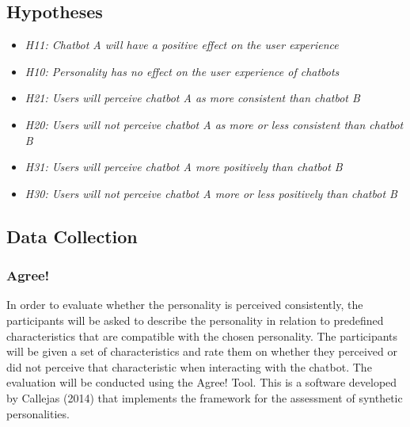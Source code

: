     \vspace{5mm} %

    \subsection{Hypotheses}
 
    \begin{itemize}
         \item \textit {H11: Chatbot A will have a positive effect on the user experience}
        \item \textit {H10: Personality has no effect on the user experience of chatbots}
            \vspace{5mm} %

        \item \textit {H21: Users will perceive chatbot A as more consistent than chatbot B}
        \item  \textit {H20: Users will not perceive chatbot A as more or less consistent than chatbot B} 
            \vspace{5mm} %

        \item \textit {H31: Users will perceive chatbot A more positively than chatbot B}
        \item \textit {H30: Users will not perceive chatbot A more or less positively than chatbot B}
    \end{itemize}
    
    \vspace{5mm} %
    
    \subsection{Data Collection}
    
    \vspace{5mm} %

     \subsubsection{Agree!}
     
     In order to evaluate whether the personality is perceived consistently, the participants will be asked to describe the personality in relation to predefined characteristics that are compatible with the chosen personality. The participants will be given a set of characteristics and rate them on whether they perceived or did not perceive that characteristic when interacting with the chatbot. The evaluation will be conducted using the Agree! Tool. This is a software developed by Callejas (2014) that implements the framework for the assessment of synthetic personalities. %
     
